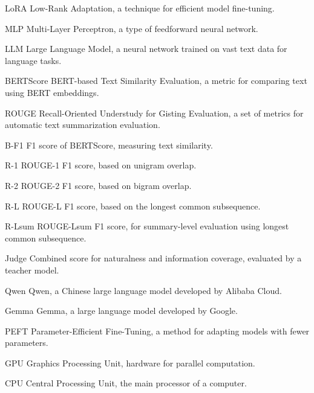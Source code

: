 \begin{denotation}[3cm]

\item[LoRA]{Low-Rank Adaptation, a technique for efficient model fine-tuning.}

\item[MLP]{Multi-Layer Perceptron, a type of feedforward neural network.}

\item[LLM]{Large Language Model, a neural network trained on vast text data for language tasks.}

\item[BERTScore]{BERT-based Text Similarity Evaluation, a metric for comparing text using BERT embeddings.}

\item[ROUGE]{Recall-Oriented Understudy for Gisting Evaluation, a set of metrics for automatic text summarization evaluation.}

\item[B-F1]{F1 score of BERTScore, measuring text similarity.}

\item[R-1]{ROUGE-1 F1 score, based on unigram overlap.}

\item[R-2]{ROUGE-2 F1 score, based on bigram overlap.}

\item[R-L]{ROUGE-L F1 score, based on the longest common subsequence.}

\item[R-Lsum]{ROUGE-Lsum F1 score, for summary-level evaluation using longest common subsequence.}

\item[Judge]{Combined score for naturalness and information coverage, evaluated by a teacher model.}

\item[Qwen]{Qwen, a Chinese large language model developed by Alibaba Cloud.}

\item[Gemma]{Gemma, a large language model developed by Google.}

\item[PEFT]{Parameter-Efficient Fine-Tuning, a method for adapting models with fewer parameters.}

\item[GPU]{Graphics Processing Unit, hardware for parallel computation.}

\item[CPU]{Central Processing Unit, the main processor of a computer.}


\end{denotation}
